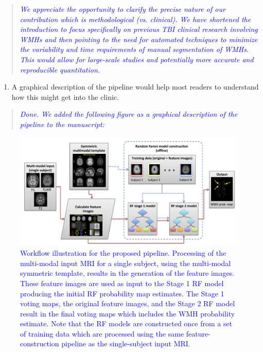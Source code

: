 \documentclass[12pt,]{article}
\providecommand{\tightlist}{%
  \setlength{\itemsep}{0pt}\setlength{\parskip}{0pt}}
\begin{document}
\begin{quote}
\emph{\textcolor{blue}{We appreciate
the opportunity to clarify the precise nature of our contribution which is methodological
(vs. clinical).  We have shortened the introduction to focus specifically on previous TBI
clinical research involving WMHs and then pointing to the need for automated
techniques to minimize the variability and time requirements of manual
segmentation of WMHs.  This would allow for large-scale studies and potentially more accurate
and reproducible quantitation.
}}
\end{quote}

\begin{enumerate}
\def\labelenumi{\arabic{enumi}.}
\setcounter{enumi}{1}
\tightlist
\item
  A graphical description of the pipeline would help most readers to
  understand how this might get into the clinic.
\end{enumerate}

\begin{quote}
\emph{\textcolor{blue}{Done.  We added the following figure as a graphical description of
the pipeline to the manuscript:}}
\end{quote}

\begin{figure}[htbp]
\centering
\includegraphics{Figures/wmhPipeline.png}
\caption{\textcolor{blue}{Workflow illustration for the proposed pipeline.  Processing of the multi-modal
input MRI for a single subject, using the multi-modal symmetric template, results in
the generation of the feature images.  These feature images are used as input to the
Stage 1 RF model producing the initial RF probability map estimates.  The Stage 1
voting maps, the original feature images, and the Stage 2 RF model result in the
final voting maps which includes the WMH probability estimate.  Note that the RF models
are constructed once from a set of training data which are processed using the
same feature-construction pipeline as the single-subject input MRI.}}
\end{figure}
\end{document}
